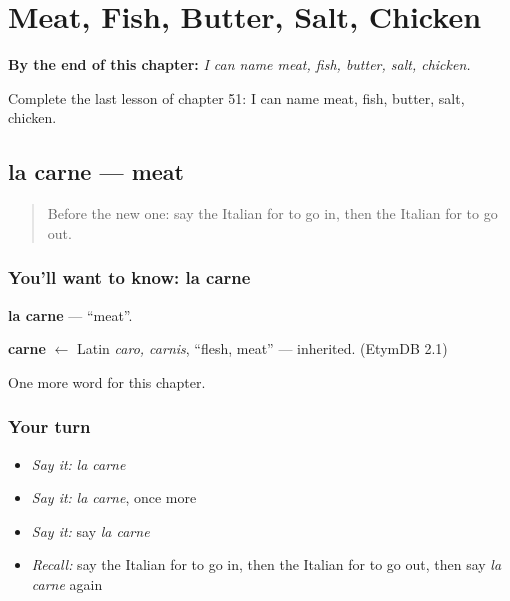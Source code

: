 
\chapter{Meat, Fish, Butter, Salt, Chicken}
\label{ch:it-meat-fish-butter-salt-chicken}

\begin{chapteropening}
\textbf{By the end of this chapter:} \emph{I can name meat, fish, butter, salt, chicken.}

Complete the last lesson of chapter 51: I can name meat, fish, butter, salt, chicken.
\end{chapteropening}

\section[la carne]{la carne — meat}

\label{lesson:IT-C51-carne}



\begin{quote}
Before the new one: say the Italian for to go in, then the Italian for to go out.
\end{quote}

\subsection*{You'll want to know: la carne}
\textbf{la carne} — \textquotedblleft{}meat\textquotedblright{}.

\begin{cousinweb}
\textbf{carne} $\leftarrow$ Latin \emph{caro, carnis}, \textquotedblleft{}flesh, meat\textquotedblright{} — inherited. (EtymDB 2.1)
\end{cousinweb}

\begin{grammarlens}[title={What you've built}]
One more word for this chapter.
\end{grammarlens}

\subsection*{Your turn}
\begin{itemize}
\raggedright
  \item \emph{Say it:} \emph{la carne}
  \item \emph{Say it:} \emph{la carne}, once more
  \item \emph{Say it:} say \emph{la carne}
  \item \emph{Recall:} say the Italian for to go in, then the Italian for to go out, then say \emph{la carne} again
\end{itemize}

